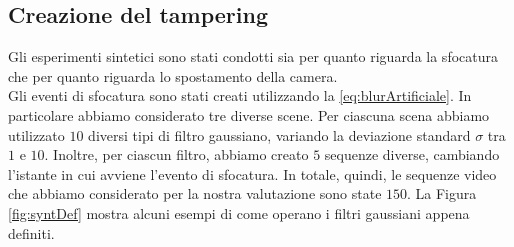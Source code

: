 \subsection{Creazione del tampering}
Gli esperimenti sintetici sono stati condotti sia per quanto riguarda la sfocatura che per quanto riguarda lo spostamento della camera.\\
Gli eventi di sfocatura sono stati creati utilizzando la \eqref{eq:blurArtificiale}.
In particolare abbiamo considerato tre diverse scene.
Per ciascuna scena abbiamo utilizzato $10$ diversi tipi di filtro gaussiano, variando la deviazione standard $\sigma$ tra $1$ e $10$.
Inoltre, per ciascun filtro, abbiamo creato $5$ sequenze diverse, cambiando l'istante in cui avviene l'evento di sfocatura.
In totale, quindi, le sequenze video che abbiamo considerato per la nostra valutazione sono state $150$.
La Figura \ref{fig:syntDef} mostra alcuni esempi di come operano i filtri gaussiani appena definiti.\\
